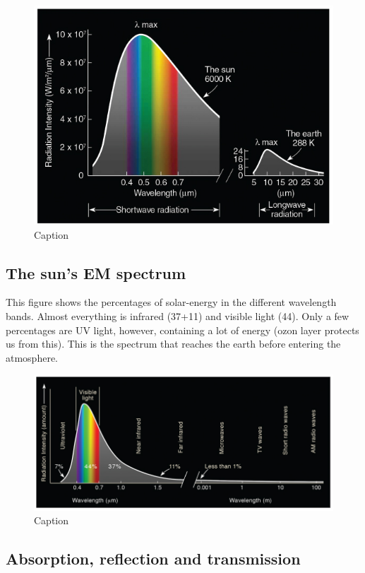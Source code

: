 \documentclass[12pt,oneside]{book}
\begin{document}
\begin{figure}

{\centering \includegraphics[width=0.5\linewidth]{figures/Figure121} 

}

\caption{Caption}\label{fig:Laws}
\end{figure}

\subsection{The sun's EM spectrum}\label{the-suns-em-spectrum}

This figure shows the percentages of solar-energy in the different
wavelength bands. Almost everything is infrared (37+11) and visible
light (44). Only a few percentages are UV light, however, containing a
lot of energy (ozon layer protects us from this). This is the spectrum
that reaches the earth before entering the atmosphere.

\begin{figure}

{\centering \includegraphics[width=1\linewidth]{figures/Figure122} 

}

\caption{Caption}\label{fig:Spectrum}
\end{figure}

\subsection{Absorption, reflection and
transmission}\label{absorption-reflection-and-transmission}
\end{document}
